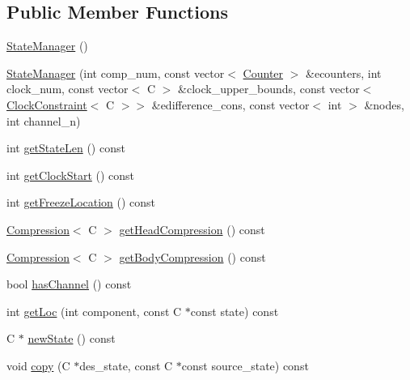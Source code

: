 \subsection*{Public Member Functions}
\begin{DoxyCompactItemize}
\item 
\mbox{\hyperlink{classgraphsat_1_1_state_manager_a0afffac67599f0522d5ba72f43fb1e7e}{State\+Manager}} ()
\item 
\mbox{\hyperlink{classgraphsat_1_1_state_manager_a509b6cdb2ca6f5d7b0d2a337433c6fb4}{State\+Manager}} (int comp\+\_\+num, const vector$<$ \mbox{\hyperlink{classgraphsat_1_1_counter}{Counter}} $>$ \&ecounters, int clock\+\_\+num, const vector$<$ C $>$ \&clock\+\_\+upper\+\_\+bounds, const vector$<$ \mbox{\hyperlink{classgraphsat_1_1_clock_constraint}{Clock\+Constraint}}$<$ C $>$$>$ \&edifference\+\_\+cons, const vector$<$ int $>$ \&nodes, int channel\+\_\+n)
\item 
int \mbox{\hyperlink{classgraphsat_1_1_state_manager_a80a6a997889366c04b9dd7094ad0b139}{get\+State\+Len}} () const
\item 
int \mbox{\hyperlink{classgraphsat_1_1_state_manager_a0779ee513588143a679a9e182caaa9b3}{get\+Clock\+Start}} () const
\item 
int \mbox{\hyperlink{classgraphsat_1_1_state_manager_aa80aa713a0b3514795714ef6b859684c}{get\+Freeze\+Location}} () const
\item 
\mbox{\hyperlink{classgraphsat_1_1_compression}{Compression}}$<$ C $>$ \mbox{\hyperlink{classgraphsat_1_1_state_manager_a387d00e5d3cd6bd2362986f037dc926e}{get\+Head\+Compression}} () const
\item 
\mbox{\hyperlink{classgraphsat_1_1_compression}{Compression}}$<$ C $>$ \mbox{\hyperlink{classgraphsat_1_1_state_manager_ab05034ce3bf10a01f6f2c7af23ffb42b}{get\+Body\+Compression}} () const
\item 
bool \mbox{\hyperlink{classgraphsat_1_1_state_manager_ab6d437e68650d61046eca910844afc59}{has\+Channel}} () const
\item 
int \mbox{\hyperlink{classgraphsat_1_1_state_manager_a519879992df5ba58f27ae21ddf766a8e}{get\+Loc}} (int component, const C $\ast$const state) const
\item 
C $\ast$ \mbox{\hyperlink{classgraphsat_1_1_state_manager_aa179767b7e599f18609d599a7233cc11}{new\+State}} () const
\item 
void \mbox{\hyperlink{classgraphsat_1_1_state_manager_a72f101a0a08cddc5553e75ea54281cbe}{copy}} (C $\ast$des\+\_\+state, const C $\ast$const source\+\_\+state) const
$$
\end{DoxyCompactItemize}
